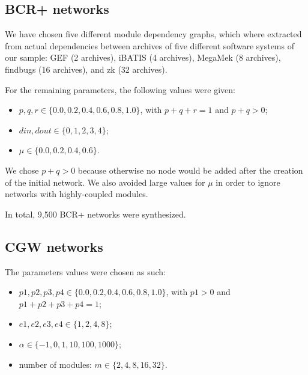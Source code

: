 \subsection{BCR+ networks}

We have chosen five different module dependency graphs, which where extracted
from actual dependencies between archives of five different software systems of
our sample: GEF (2 archives), iBATIS (4 archives), MegaMek (8 archives),
findbugs (16 archives), and zk (32 archives). 

For the remaining parameters, the following values were given:

\begin{itemize}
\item $p, q, r \in \{0.0, 0.2, 0.4, 0.6, 0.8, 1.0\}$, with $p + q + r = 1$ and
$p + q > 0$;
\item $din, dout \in \{0, 1, 2, 3, 4\}$;
\item $\mu \in \{0.0, 0.2, 0.4, 0.6\}$.
\end{itemize}

We chose $p + q > 0$ because otherwise no node would be added after the
creation of the initial network. We also avoided large values for $\mu$ in
order to ignore networks with highly-coupled modules. 

In total, 9,500 BCR+ networks were synthesized.

\subsection{CGW networks}

The parameters values were chosen as such:

\begin{itemize}
\item $p1, p2, p3, p4 \in \{0.0, 0.2, 0.4, 0.6, 0.8, 1.0\}$, with $p1 > 0$ and
$p1 + p2 + p3 + p4 = 1$;
\item $e1, e2, e3, e4 \in \{1, 2, 4, 8\}$;
\item $\alpha \in \{-1, 0, 1, 10, 100, 1000\}$;
\item number of modules: $m \in \{2, 4, 8, 16, 32\}$.
\end{itemize}

